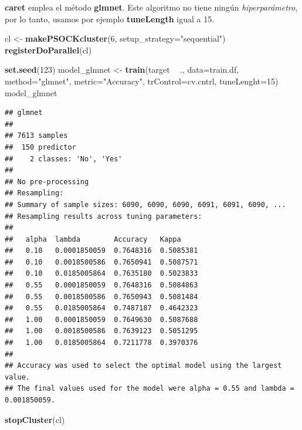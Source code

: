 \documentclass[]{article}
\newenvironment{Shaded}{\begin{snugshade}}{\end{snugshade}}
\newcommand{\DataTypeTok}[1]{\textcolor[rgb]{0.13,0.29,0.53}{#1}}
\newcommand{\DecValTok}[1]{\textcolor[rgb]{0.00,0.00,0.81}{#1}}
\newcommand{\KeywordTok}[1]{\textcolor[rgb]{0.13,0.29,0.53}{\textbf{#1}}}
\newcommand{\NormalTok}[1]{#1}
\newcommand{\OperatorTok}[1]{\textcolor[rgb]{0.81,0.36,0.00}{\textbf{#1}}}
\newcommand{\StringTok}[1]{\textcolor[rgb]{0.31,0.60,0.02}{#1}}
\begin{document}
\textbf{caret} emplea el método \textbf{glmnet}. Este algoritmo no tiene
ningún \emph{hiperparámetro}, por lo tanto, usamos por ejemplo
\textbf{tuneLength} igual a 15.

\begin{Shaded}
\begin{Highlighting}[]
\NormalTok{cl <-}\StringTok{ }\KeywordTok{makePSOCKcluster}\NormalTok{(}\DecValTok{6}\NormalTok{, }\DataTypeTok{setup_strategy=}\StringTok{"sequential"}\NormalTok{)}
\KeywordTok{registerDoParallel}\NormalTok{(cl)}
\end{Highlighting}
\end{Shaded}

\begin{Shaded}
\begin{Highlighting}[]
\KeywordTok{set.seed}\NormalTok{(}\DecValTok{123}\NormalTok{)}
\NormalTok{model_glmnet <-}\StringTok{ }\KeywordTok{train}\NormalTok{(target }\OperatorTok{~}\StringTok{ }\NormalTok{., }\DataTypeTok{data=}\NormalTok{train.df,}
                      \DataTypeTok{method=}\StringTok{"glmnet"}\NormalTok{,}
                      \DataTypeTok{metric=}\StringTok{"Accuracy"}\NormalTok{,}
                      \DataTypeTok{trControl=}\NormalTok{cv.cntrl,}
                      \DataTypeTok{tuneLenght=}\DecValTok{15}\NormalTok{)}
\NormalTok{model_glmnet}
\end{Highlighting}
\end{Shaded}

\begin{verbatim}
## glmnet 
## 
## 7613 samples
##  150 predictor
##    2 classes: 'No', 'Yes' 
## 
## No pre-processing
## Resampling: 
## Summary of sample sizes: 6090, 6090, 6090, 6091, 6091, 6090, ... 
## Resampling results across tuning parameters:
## 
##   alpha  lambda        Accuracy   Kappa    
##   0.10   0.0001850059  0.7648316  0.5085381
##   0.10   0.0018500586  0.7650941  0.5087571
##   0.10   0.0185005864  0.7635180  0.5023833
##   0.55   0.0001850059  0.7648316  0.5084863
##   0.55   0.0018500586  0.7650943  0.5081484
##   0.55   0.0185005864  0.7487187  0.4642323
##   1.00   0.0001850059  0.7649630  0.5087688
##   1.00   0.0018500586  0.7639123  0.5051295
##   1.00   0.0185005864  0.7211778  0.3970376
## 
## Accuracy was used to select the optimal model using the largest value.
## The final values used for the model were alpha = 0.55 and lambda = 0.001850059.
\end{verbatim}

\begin{Shaded}
\begin{Highlighting}[]
\KeywordTok{stopCluster}\NormalTok{(cl)}
\end{Highlighting}
\end{Shaded}
\end{document}
